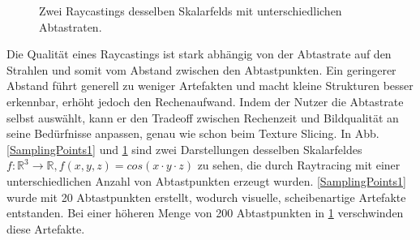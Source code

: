 \documentclass[a4paper,fontsize=12pt,toc=bib,halfparskip]{scrartcl}
\begin{document}
\begin{figure}
\begin{minipage}{0.5\textwidth}
\begin{subfigure}{0.7\textwidth}
			\subcaption{}
			\label{SamplingPoints2}
		\end{subfigure}
	\end{minipage}
	\caption{Zwei Raycastings desselben Skalarfelds mit unterschiedlichen Abtastraten.}
	\label{SamplingPoints}
\end{figure}

Die Qualit\"at eines Raycastings ist stark abh\"angig von der Abtastrate auf den Strahlen und somit vom Abstand zwischen den Abtastpunkten. Ein geringerer Abstand f\"uhrt generell zu weniger Artefakten und macht kleine Strukturen besser erkennbar, erh\"oht jedoch den Rechenaufwand. Indem der Nutzer die Abtastrate selbst ausw\"ahlt, kann er den Tradeoff zwischen Rechenzeit und Bildqualit\"at an seine Bed\"urfnisse anpassen, genau wie schon beim Texture Slicing. In Abb. \ref{SamplingPoints1} und \ref{SamplingPoints2} sind zwei Darstellungen desselben Skalarfeldes $f:\mathbb{R}^3\rightarrow\mathbb{R}, f(x, y, z)=cos(x\cdot y\cdot z)$ zu sehen, die durch Raytracing mit einer unterschiedlichen Anzahl von Abtastpunkten erzeugt wurden. \ref{SamplingPoints1} wurde mit 20 Abtastpunkten erstellt, wodurch visuelle, scheibenartige Artefakte entstanden. Bei einer h\"oheren Menge von 200 Abtastpunkten in \ref{SamplingPoints2} verschwinden diese Artefakte.
\end{document}
